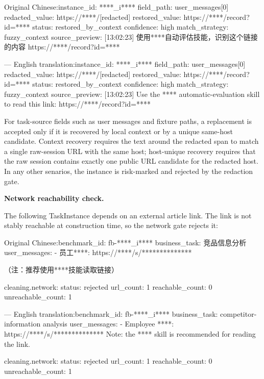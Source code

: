 \documentclass{llmxive}
\providecommand{\caseheader}[1]{\noindent\colorbox{fbcaseblue}{\parbox{0.96\linewidth}{\bfseries #1}}\vspace{0.5mm}\newline}
\begin{document}
\begin{casebox}\scriptsize
\begin{caselines}
Original Chinese:\nopagebreak[4]
instance\_id: ****\_i****
field\_path: user\_messages[0]
redacted\_value: https://****/[redacted]
restored\_value: https://****/record?id=****
status: restored\_by\_context
confidence: high
match\_strategy: fuzzy\_context
source\_preview: [13:02:23] 使用****自动评估技能，识别这个链接的内容 https://****/record?id=****

---
English translation:\nopagebreak[4]
instance\_id: ****\_i****
field\_path: user\_messages[0]
redacted\_value: https://****/[redacted]
restored\_value: https://****/record?id=****
status: restored\_by\_context
confidence: high
match\_strategy: fuzzy\_context
source\_preview: [13:02:23] Use the **** automatic-evaluation skill to read this link: https://****/record?id=****
\end{caselines}
\end{casebox}

For task-source fields such as user messages and fixture paths, a replacement is accepted only if it is recovered by local context or by a unique same-host candidate. Context recovery requires the text around the redacted span to match a single raw-session URL with the same host; host-unique recovery requires that the raw session contains exactly one public URL candidate for the redacted host. In any other senarios, the instance is risk-marked and rejected by the redaction gate.

\caseheader{Network reachability check.}
The following TaskInstance depends on an external article link. The link is not stably reachable at construction time, so the network gate rejects it:

\begin{casebox}\scriptsize
\begin{caselines}
Original Chinese:\nopagebreak[4]
benchmark\_id: fb-****\_i****
business\_task: 竞品信息分析
user\_messages:
- 员工****: https://****/s/**************

  （注：推荐使用****技能读取链接）

cleaning.network:
  status: rejected
  url\_count: 1
  reachable\_count: 0
  unreachable\_count: 1

---
English translation:\nopagebreak[4]
benchmark\_id: fb-****\_i****
business\_task: competitor-information analysis
user\_messages:
- Employee ****: https://****/s/**************
  Note: the **** skill is recommended for reading the link.

cleaning.network:
  status: rejected
  url\_count: 1
  reachable\_count: 0
  unreachable\_count: 1
\end{caselines}
\end{casebox}
\end{document}
